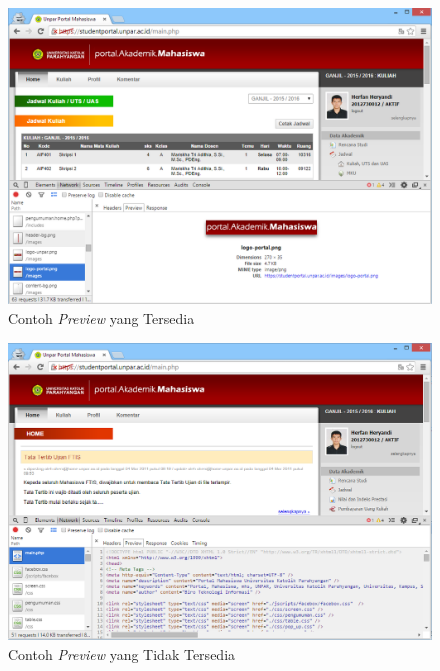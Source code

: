 \documentclass[a4paper,twoside]{article}
\begin{document}
\begin{enumerate}
\begin{enumerate}
\begin{itemize}
\begin{figure}[H]
	\centering
	\includegraphics[scale=0.5]{Gambar/network-preview-available}
	\caption{Contoh \textit{Preview} yang Tersedia} 
	\label{fig:2_network_prev_available}
\end{figure}

\begin{figure}[H]
	\centering
	\includegraphics[scale=0.5]{Gambar/network-preview-notAvailable}
	\caption{Contoh \textit{Preview} yang Tidak Tersedia} 
	\label{fig:2_network_prev_notavailable}
\end{figure}


\end{itemize}
\end{enumerate}
\end{enumerate}
\end{document}
